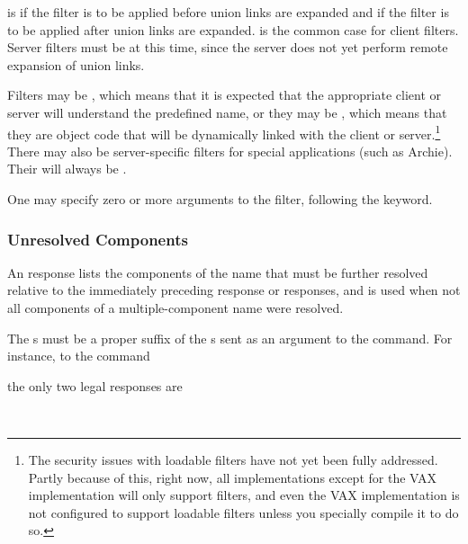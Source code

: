  is  if the filter is to be applied before
union links are expanded and  if the filter is to be applied
after union links are expanded.   is the common case for
client filters.  Server filters must be  at this time, since
the server does not yet perform remote expansion of union links.

Filters may be , which means that it is expected that
the appropriate client or server will understand the predefined name, or
they may be , which means that they are object 
code that will be dynamically linked with the client or
server.\footnote{
 The security issues with loadable filters have
 not yet been fully addressed.  Partly because of this,  right now, all
 implementations except for the VAX implementation will only support
  filters, and even the VAX implementation is not
 configured to support loadable filters unless you specially compile it
 to do so.
}  
There may also be server-specific  filters
for special applications (such as Archie).  Their
 will always be .

One may specify zero or more arguments to the filter, following the
 keyword.

\subsubsection{Unresolved Components}

An  response lists the components of the name that must be
further resolved relative to the immediately preceding 
response or responses, and is used when not all components of a
multiple-component name were resolved. 

\begin{command}
   \zoms{}\zome
\end{command}

The s must be a proper suffix of
the s sent as an argument to the 
command.  For instance, to the command 

\begin{command}
\end{command}

the only two legal  responses are 
\begin{command}
     \\
   
\end{command}

